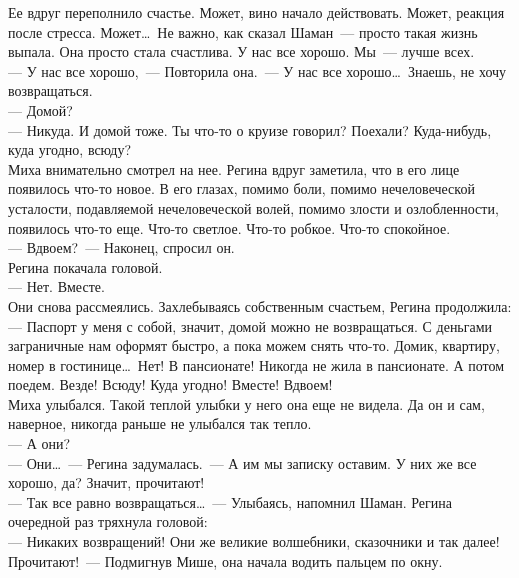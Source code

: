 Ее вдруг переполнило счастье. Может, вино начало действовать. Может, реакция 
после стресса. Может\ldots\ Не важно, как сказал Шаман~--- просто такая жизнь 
выпала. Она просто стала счастлива. У нас все хорошо. Мы~--- лучше всех.\\
--- У нас все хорошо,~--- Повторила она.~--- У нас все хорошо\ldots\ Знаешь, не 
хочу возвращаться.\\
--- Домой?\\
--- Никуда. И домой тоже. Ты что-то о круизе говорил? Поехали? Куда-нибудь, куда 
угодно, всюду?\\
Миха внимательно смотрел на нее. Регина вдруг заметила, что в его лице 
появилось что-то новое. В его глазах, помимо боли, помимо нечеловеческой усталости, 
подавляемой нечеловеческой волей, помимо злости и озлобленности, появилось 
что-то еще. Что-то светлое. Что-то робкое. Что-то спокойное.\\
--- Вдвоем?~--- Наконец, спросил он.\\
Регина покачала головой.\\
--- Нет. Вместе.\\
Они снова рассмеялись. Захлебываясь собственным счастьем, Регина продолжила:\\
--- Паспорт у меня с собой, значит, домой можно не возвращаться. С деньгами 
заграничные нам оформят быстро, а пока можем снять что-то. Домик, квартиру, 
номер в гостинице\ldots\ Нет! В пансионате! Никогда не жила в пансионате. А 
потом поедем. Везде! Всюду! Куда угодно! Вместе! Вдвоем!\\
Миха улыбался. Такой теплой улыбки у него она еще не видела. Да он и сам, 
наверное, никогда раньше не улыбался так тепло.\\
--- А они?\\
--- Они\ldots~--- Регина задумалась.~--- А им мы записку оставим. У них же все 
хорошо, да? Значит, прочитают!\\
--- Так все равно возвращаться\ldots~--- Улыбаясь, напомнил Шаман. Регина 
очередной раз тряхнула головой:\\
--- Никаких возвращений! Они же великие волшебники, сказочники и так далее! 
Прочитают!~--- Подмигнув Мише, она начала водить пальцем по окну.




